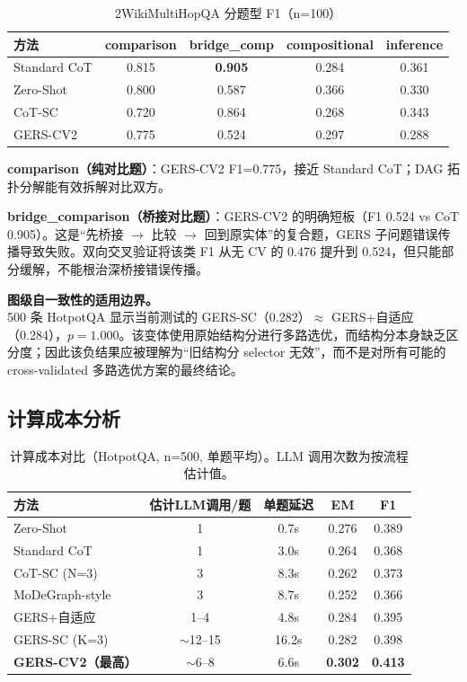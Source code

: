 \documentclass[11pt,a4paper]{ctexart}
\begin{document}
\begin{table}[h]
\centering
\caption{2WikiMultiHopQA 分题型 F1（n=100）}
\begin{tabular}{lcccc}
\toprule
方法 & comparison & bridge\_comp & compositional & inference \\
\midrule
Standard CoT & 0.815 & \textbf{0.905} & 0.284 & 0.361 \\
Zero-Shot & 0.800 & 0.587 & 0.366 & 0.330 \\
CoT-SC & 0.720 & 0.864 & 0.268 & 0.343 \\
GERS-CV2 & 0.775 & 0.524 & 0.297 & 0.288 \\
\bottomrule
\end{tabular}
\end{table}

\textbf{comparison（纯对比题）}：GERS-CV2 F1=0.775，接近 Standard CoT；DAG 拓扑分解能有效拆解对比双方。

\textbf{bridge\_comparison（桥接对比题）}：GERS-CV2 的明确短板（F1 0.524 vs CoT 0.905）。这是``先桥接 $\to$ 比较 $\to$ 回到原实体''的复合题，GERS 子问题错误传播导致失败。双向交叉验证将该类 F1 从无 CV 的 0.476 提升到 0.524，但只能部分缓解，不能根治深桥接错误传播。

\textbf{图级自一致性的适用边界。}500 条 HotpotQA 显示当前测试的 GERS-SC（0.282）$\approx$ GERS+自适应（0.284），$p=1.000$。该变体使用原始结构分进行多路选优，而结构分本身缺乏区分度；因此该负结果应被理解为``旧结构分 selector 无效''，而不是对所有可能的 cross-validated 多路选优方案的最终结论。

\subsection{计算成本分析}

\begin{table}[h]
\centering
\caption{计算成本对比（HotpotQA, n=500, 单题平均）。LLM 调用次数为按流程估计值。}
\begin{tabular}{lcccc}
\toprule
方法 & 估计LLM调用/题 & 单题延迟 & EM & F1 \\
\midrule
Zero-Shot & 1 & 0.7s & 0.276 & 0.389 \\
Standard CoT & 1 & 3.0s & 0.264 & 0.368 \\
CoT-SC (N=3) & 3 & 8.3s & 0.262 & 0.373 \\
MoDeGraph-style & 3 & 8.7s & 0.252 & 0.366 \\
GERS+自适应 & 1--4 & 4.8s & 0.284 & 0.395 \\
GERS-SC (K=3) & $\sim$12--15 & 16.2s & 0.282 & 0.398 \\
\textbf{GERS-CV2（最高）} & $\sim$6--8 & 6.6s & \textbf{0.302} & \textbf{0.413} \\
\bottomrule
\end{tabular}
\end{table}
\end{document}

